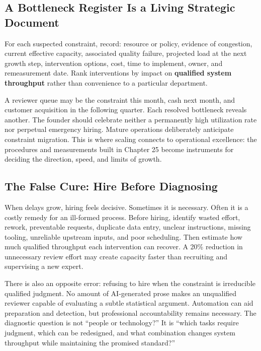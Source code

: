 \subsection{A Bottleneck Register Is a Living Strategic Document}
\label{sec:bottleneck_register_living_document}

For each suspected constraint, record: resource or policy, evidence of congestion, current effective capacity, associated quality failure, projected load at the next growth step, intervention options, cost, time to implement, owner, and remeasurement date. Rank interventions by impact on \textbf{qualified system throughput} rather than convenience to a particular department.

A reviewer queue may be the constraint this month, cash next month, and customer acquisition in the following quarter. Each resolved bottleneck reveals another. The founder should celebrate neither a permanently high utilization rate nor perpetual emergency hiring. Mature operations deliberately anticipate constraint migration. This is where scaling connects to operational excellence: the procedures and measurements built in Chapter 25 become instruments for deciding the direction, speed, and limits of growth.

\subsection{The False Cure: Hire Before Diagnosing}
\label{sec:false_cure_hire_before_diagnosing}

When delays grow, hiring feels decisive. Sometimes it is necessary. Often it is a costly remedy for an ill-formed process. Before hiring, identify wasted effort, rework, preventable requests, duplicate data entry, unclear instructions, missing tooling, unreliable upstream inputs, and poor scheduling. Then estimate how much qualified throughput each intervention can recover. A 20\% reduction in unnecessary review effort may create capacity faster than recruiting and supervising a new expert.

There is also an opposite error: refusing to hire when the constraint is irreducible qualified judgment. No amount of AI-generated prose makes an unqualified reviewer capable of evaluating a subtle statistical argument. Automation can aid preparation and detection, but professional accountability remains necessary. The diagnostic question is not ``people or technology?'' It is ``which tasks require judgment, which can be redesigned, and what combination changes system throughput while maintaining the promised standard?''

